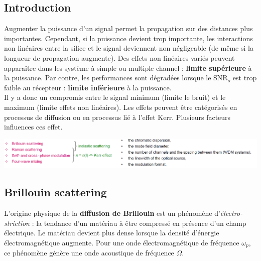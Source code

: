 \subsection{Introduction}
Augmenter la puissance d'un signal permet la propagation sur des distances plus importantes. Cependant, si la
puissance devient trop importante, les interactions non linéaires entre la silice et le signal deviennent non 
négligeable (de même si la longueur de propagation augmente). Des effets non linéaires variés peuvent apparaître
dans les système à simple ou multiple channel : \textbf{limite supérieure} à la puissance. Par contre, les
performances sont dégradées lorsque le SNR$_o$ est trop faible au récepteur : \textbf{limite inférieure} à la
puissance.\\

Il y a donc un compromis entre le signal minimum (limite le bruit) et le maximum (limite effets non linéaires).
Les effets peuvent être catégorisés en processus de diffusion ou en processus lié à l'effet Kerr. Plusieurs facteurs
influences ces effet.
\begin{center}
	\includegraphics[scale=0.3]{ch6/image24}
\end{center}
\newpage

\subsection{Brillouin scattering}
L'origine physique de la \textbf{diffusion de Brillouin} est un phénomène 
d'\textit{électro-striction} : la tendance d'un matériau à être compressé en présence d'un champ
électrique. Le matériau devient plus dense lorsque la densité d'énergie électromagnétique augmente. 
Pour une onde électromagnétique de fréquence $\omega_p$, ce phénomène génère une onde acoustique
de fréquence $\Omega$. \\

